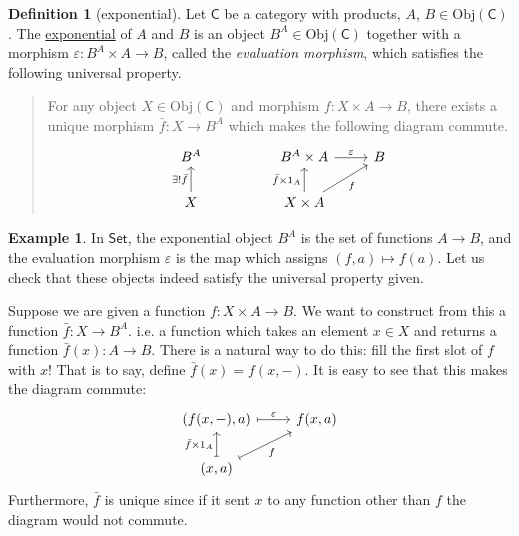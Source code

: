 \documentclass[a4paper,10pt]{scrreprt}
\newcommand{\defn}[1]{\ul{#1}}
\newcommand{\Obj}{\mathrm{Obj}}
\theoremstyle{definition}
\newtheorem{definition}{Definition}[section]
\newtheorem{example}{Example}[section]
\theoremstyle{plain}
\theoremstyle{remark}
\begin{document}
\begin{definition}[exponential]
  \label{def:exponential}
  Let $\mathsf{C}$ be a category with products, $A$, $B \in \Obj(\mathsf{C})$. The \defn{exponential} of $A$ and $B$ is an object $B^{A} \in \Obj(\mathsf{C})$ together with a morphism $\varepsilon\colon B^{A} \times A \to B$, called the \emph{evaluation morphism}, which satisfies the following universal property.

  \begin{quote}
    For any object $X \in \Obj(\mathsf{C})$ and morphism $f\colon X \times A \to B$, there exists a unique morphism $\bar{f}\colon X \to B^{A}$ which makes the following diagram commute.
    \begin{equation*}
      \begin{tikzcd}
        B^{A}
        & & B^{A} \times A
        \arrow[r, "\varepsilon"]
        & B
        \\
        X 
        \arrow[u, "\exists!\bar{f}"]
        & & X \times A
        \arrow[ur, swap, "f"]
        \arrow[u, "\bar{f} \times 1_{A}"]
      \end{tikzcd}
    \end{equation*}
  \end{quote}
\end{definition}

\begin{example}
  In $\mathsf{Set}$, the exponential object $B^{A}$ is the set of functions $A \to B$, and the evaluation morphism $\varepsilon$ is the map which assigns $(f, a) \mapsto f(a)$. Let us check that these objects indeed satisfy the universal property given.

  Suppose we are given a function $f\colon X \times A \to B$. We want to construct from this a function $\bar{f}\colon X \to B^{A}$. i.e. a function which takes an element $x \in X$ and returns a function $\bar{f}(x)\colon A \to B$. There is a natural way to do this: fill the first slot of $f$ with $x$! That is to say, define $\bar{f}(x) = f(x, -)$. It is easy to see that this makes the diagram commute:
  \begin{equation*}
    \begin{tikzcd}
      {(f(x,-), a)}
      \arrow[r, mapsto, "\varepsilon"]
      &{f(x, a)}
      \\
      {(x, a)}
      \arrow[u, mapsto, "\bar{f} \times 1_{A}"]
      \arrow[ur, mapsto, swap, "f"]
    \end{tikzcd}
  \end{equation*}
  Furthermore, $\bar{f}$ is unique since if it sent $x$ to any function other than $f$ the diagram would not commute.
\end{example}
\end{document}
